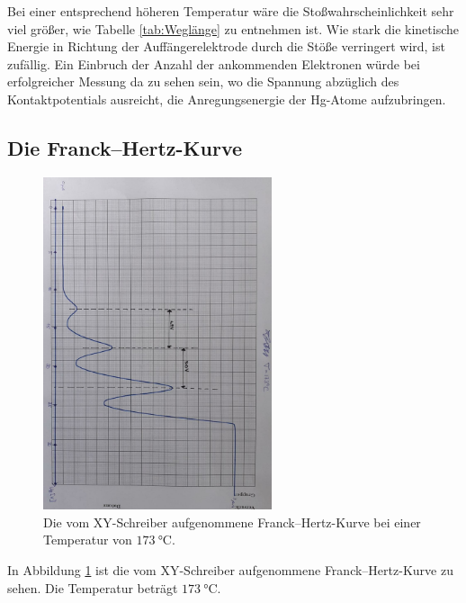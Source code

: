 Bei einer entsprechend höheren Temperatur wäre die Stoßwahrscheinlichkeit sehr viel größer, wie Tabelle \ref{tab:Weglänge} 
zu entnehmen ist. Wie stark die kinetische Energie in Richtung der Auffängerelektrode durch die Stöße verringert wird, 
ist zufällig. 
Ein Einbruch der Anzahl der ankommenden Elektronen würde bei erfolgreicher Messung da zu sehen sein, wo die Spannung abzüglich des Kontaktpotentials ausreicht, 
die Anregungsenergie der Hg-Atome aufzubringen. 

\subsection{Die Franck--Hertz-Kurve}

\begin{figure}
    \centering
    \includegraphics[width=0.6\textwidth,angle=90]{plots/Plot22.jpeg}
    \caption{Die vom XY-Schreiber aufgenommene Franck--Hertz-Kurve bei einer Temperatur von $\SI{173}{\degreeCelsius}$.}
    \label{fig:FrHeMess}
\end{figure}
In Abbildung \ref{fig:FrHeMess} ist die vom XY-Schreiber aufgenommene Franck--Hertz-Kurve zu sehen. 
Die Temperatur beträgt $\SI{173}{\degreeCelsius}$. 

